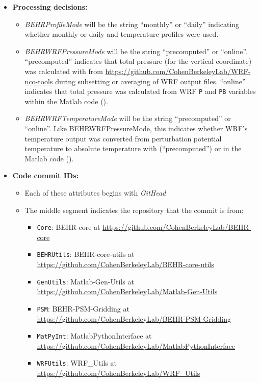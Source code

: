 \documentclass[12pt]{article}
\begin{document}
\begin{itemize}
	\item \textbf{Processing decisions:}
		\begin{itemize}
		\item \emph{BEHRProfileMode} will be the string ``monthly'' or ``daily'' indicating whether monthly or daily  and temperature profiles were used.
		\item \emph{BEHRWRFPressureMode} will be the string ``precomputed'' or ``online''.  ``precomputed'' indicates that total pressure (for the vertical coordinate) was calculated with  from \url{https://github.com/CohenBerkeleyLab/WRF-nco-tools} during subsetting or averaging of WRF output files.  ``online'' indicates that total pressure was calculated from WRF \lstinline$P$ and \lstinline$PB$ variables within the Matlab code ().
		\item \emph{BEHRWRFTemperatureMode} will be the string ``precomputed'' or ``online''. Like BEHRWRFPressureMode, this indicates whether WRF's temperature output was converted from perturbation potential temperature to absolute temperature with  (``precomputed'') or in the Matlab code ().
		\end{itemize}
		
	\item \textbf{Code commit IDs:}
		\begin{itemize}
		\item Each of these attributes begins with \emph{GitHead}
		\item The middle segment indicates the repository that the commit is from:
			\begin{itemize}
			\item \lstinline$Core$: BEHR-core at \url{https://github.com/CohenBerkeleyLab/BEHR-core}
			\item \lstinline$BEHRUtils$: BEHR-core-utils at \url{https://github.com/CohenBerkeleyLab/BEHR-core-utils}
			\item \lstinline$GenUtils$: Matlab-Gen-Utils at \url{https://github.com/CohenBerkeleyLab/Matlab-Gen-Utils}
			\item \lstinline$PSM$: BEHR-PSM-Gridding at \url{https://github.com/CohenBerkeleyLab/BEHR-PSM-Gridding}
			\item \lstinline$MatPyInt$: MatlabPythonInterface at \url{https://github.com/CohenBerkeleyLab/MatlabPythonInterface}
			\item \lstinline$WRFUtils$: WRF\_Utils at \url{https://github.com/CohenBerkeleyLab/WRF_Utils}
			\end{itemize}
		

\end{itemize}
\end{itemize}
\end{document}
